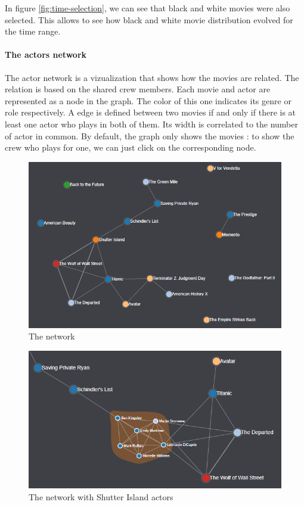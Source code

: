 \documentclass[a4paper,10pt]{article}
\begin{document}
In figure \ref{fig:time-selection}, we can see that black and white movies were
also selected. This allows to see how black and white movie distribution evolved
for the time range.



\paragraph{The actors network}
The actor network is a vizualization that shows how the movies are related.
The relation is based on the shared crew members. Each movie and actor are represented as
a node in the graph. The color of this one indicates its genre or role respectively.
A edge is defined between two movies if and only if there is at least one actor who
plays in both of them. Its width is correlated to the number of actor in common.
By default, the graph only shows the movies : to show the crew who plays for one,
we can just click on the corresponding node.

\begin{figure}[ht]
   \centering
   \includegraphics[width=0.6\linewidth]{images/screens/network-movies.png}
  \caption{The network} \label{fig:screen-network-movies}
\end{figure}

\begin{figure}[ht]
   \centering
   \includegraphics[width=0.6\linewidth]{images/screens/network-movies-shutter-island.png}
  \caption{The network with Shutter Island actors} \label{fig:screen-network-movies-shutter-island}
\end{figure}
\end{document}
